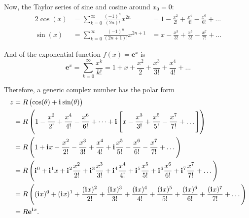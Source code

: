 \documentclass{article}
\newcommand{\iu}{\mathbf{i}\mkern1mu}
\newcommand{\Eu}[1]{\mathbf{e}^{#1}}
\begin{document}
Now, the Taylor series of sine and cosine around $x_{0}=0$:
\begin{alignat}{2}
	\cos(x) & = \sum\limits_{k=0}^{\infty} \frac{(-1)^{n}}{(2n)!}x^{2n}     & = 1 - \frac{x^2}{2!} + \frac{x^4}{4!} - \frac{x^6}{6!} + \dots \\
	\sin(x) & = \sum\limits_{k=0}^{\infty} \frac{(-1)^{n}}{(2n+1)!}x^{2n+1} & = x-\frac{x^3}{3!}+\frac{x^5}{5!} - \frac{x^7}{7!} + \dots
	\label{eq:cosine_and_sine_taylor}
\end{alignat}

And of the exponential function $f(x)=\Eu{x}$ is
\begin{equation}
	\Eu{x} = \sum\limits_{k=0}^{\infty} \frac{x^{k}}{k!} = 1 + x + \frac{x^2}{2} + \frac{x^3}{3!} + \frac{x^4}{4!} + \dots
	\label{eq:exp_taylor}
\end{equation}

Therefore, a generic complex number has the polar form
\begin{equation}
	\begin{aligned}
		z & = R \left( \cos(\theta) + \iu\sin(\theta) \right)                                                                                                                                       \\
		  & = R \left(1 - \frac{x^2}{2!} + \frac{x^4}{4!} - \frac{x^6}{6!} + \dots + \iu\left[x-\frac{x^3}{3!}+\frac{x^5}{5!} - \frac{x^7}{7!} + \dots\right] \right)                               \\
		  & = R\left(1 + \iu x - \frac{x^2}{2!} - \frac{x^3}{3!} + \frac{x^4}{4!} + \iu\frac{x^5}{5!} - \frac{x^6}{6!} - \frac{x^7}{7!} + \dots \right)                                             \\
		  & = R\left(\iu^0 + \iu^1 x + \iu^2 \frac{x^2}{2!} + \iu^3 \frac{x^3}{3!} + \iu^4 \frac{x^4}{4!} + \iu^5 \frac{x^5}{5!} + \iu^6 \frac{x^6}{6!} + \iu^7 \frac{x^7}{7!} + \dots \right)      \\
		  & = R\left((\iu x)^0 + (\iu x)^1 + \frac{(\iu x)^2}{2!} + \frac{(\iu x)^3}{3!} + \frac{(\iu x)^4}{4!} + \frac{(\iu x)^5}{5!} + \frac{(\iu x)^6}{6!} + \frac{(\iu x)^7}{7!} + \dots\right) \\
		  & = R\Eu{\iu x}.
	\end{aligned}
	\label{eq:}
\end{equation}

\end{document}
